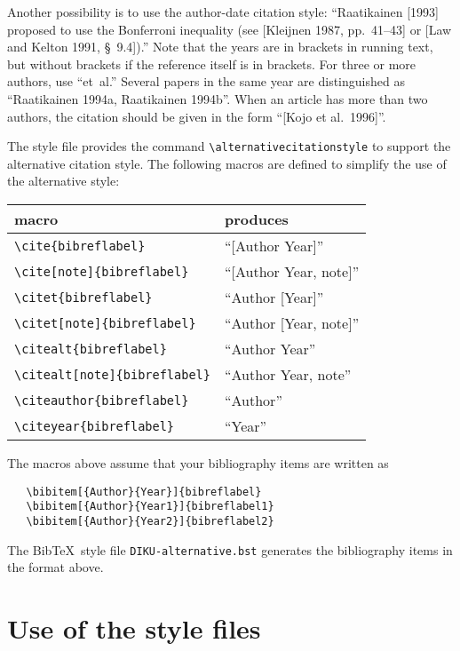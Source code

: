 \documentclass{DIKU-report}[2006/05/09]
\begin{document}
Another possibility is to use the author-date citation style:
``Raatikainen [1993] proposed to use the Bonferroni inequality (see
[Kleijnen 1987, pp.~41--43] or [Law and Kelton 1991, \S~9.4]).''  Note
that the years are in brackets in running text, but without brackets
if the reference itself is in brackets.  For three or more authors,
use ``et~al.''  Several papers in the same year are distinguished as
``Raatikainen 1994a, Raatikainen 1994b''.  When an article has more
than two authors, the citation should be given in the form ``[Kojo et
  al.\ 1996]''.

The style file provides the command \verb|\alternativecitationstyle|
to support the alternative citation style.
The following macros are defined to simplify the use of the
alternative style:

\begin{center}\begin{tabular}{ll}
\hline
 macro & produces\\ \hline
 \verb|\cite{bibreflabel}| & ``[Author Year]''\\ 
 \verb|\cite[note]{bibreflabel}| & ``[Author Year, note]''\\ 
 \verb|\citet{bibreflabel}| & ``Author [Year]''\\ 
 \verb|\citet[note]{bibreflabel}| & ``Author [Year, note]''\\ 
 \verb|\citealt{bibreflabel}| & ``Author Year''\\ 
 \verb|\citealt[note]{bibreflabel}| & ``Author Year, note''\\ 
 \verb|\citeauthor{bibreflabel}| & ``Author''\\ 
 \verb|\citeyear{bibreflabel}| & ``Year''\\ 
\hline
\end{tabular}\end{center}

\noindent
The macros above assume that your bibliography items are written as
\begin{verbatim}
   \bibitem[{Author}{Year}]{bibreflabel}
   \bibitem[{Author}{Year1}]{bibreflabel1}
   \bibitem[{Author}{Year2}]{bibreflabel2}
\end{verbatim}
The Bib\TeX\ style file \texttt{DIKU-alternative.bst} generates
the bibliography items in the format above.

\section{Use of the style files}
\end{document}
